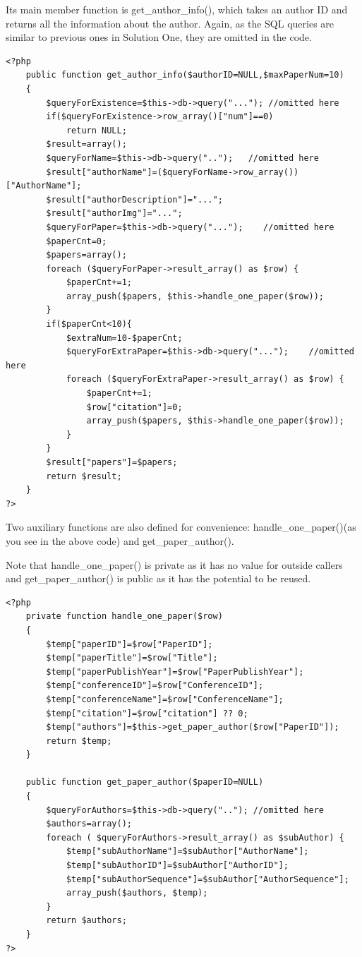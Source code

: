 \documentclass[a4paper]{article}
\begin{document}
Its main member function is get\_author\_info(), which takes an author ID and returns all the information about the author. Again, as the SQL queries are similar to previous ones in Solution One, they are omitted in the code.
                \begin{verbatim}
<?php
    public function get_author_info($authorID=NULL,$maxPaperNum=10)
    {
        $queryForExistence=$this->db->query("..."); //omitted here
        if($queryForExistence->row_array()["num"]==0)
            return NULL;
        $result=array();
        $queryForName=$this->db->query("..");   //omitted here
        $result["authorName"]=($queryForName->row_array())["AuthorName"];
        $result["authorDescription"]="...";
        $result["authorImg"]="...";
        $queryForPaper=$this->db->query("...");    //omitted here
        $paperCnt=0;
        $papers=array();
        foreach ($queryForPaper->result_array() as $row) {
            $paperCnt+=1;
            array_push($papers, $this->handle_one_paper($row));
        }
        if($paperCnt<10){
            $extraNum=10-$paperCnt;
            $queryForExtraPaper=$this->db->query("...");    //omitted here
            foreach ($queryForExtraPaper->result_array() as $row) {
                $paperCnt+=1;
                $row["citation"]=0;
                array_push($papers, $this->handle_one_paper($row));
            }
        }
        $result["papers"]=$papers;
        return $result;
    }
?>

                \end{verbatim}
Two auxiliary functions are also defined for convenience: handle\_one\_paper()(as you see in the above code) and get\_paper\_author().

Note that handle\_one\_paper() is private as it has no value for outside callers and get\_paper\_author() is public as it has the potential to be reused.
                \begin{verbatim}
<?php
    private function handle_one_paper($row)
    {
        $temp["paperID"]=$row["PaperID"];
        $temp["paperTitle"]=$row["Title"];
        $temp["paperPublishYear"]=$row["PaperPublishYear"];
        $temp["conferenceID"]=$row["ConferenceID"];
        $temp["conferenceName"]=$row["ConferenceName"];
        $temp["citation"]=$row["citation"] ?? 0;
        $temp["authors"]=$this->get_paper_author($row["PaperID"]);
        return $temp;
    }

    public function get_paper_author($paperID=NULL)
    {
        $queryForAuthors=$this->db->query(".."); //omitted here
        $authors=array();
        foreach ( $queryForAuthors->result_array() as $subAuthor) {
            $temp["subAuthorName"]=$subAuthor["AuthorName"];
            $temp["subAuthorID"]=$subAuthor["AuthorID"];
            $temp["subAuthorSequence"]=$subAuthor["AuthorSequence"];
            array_push($authors, $temp);
        }
        return $authors;
    }
?>
                \end{verbatim}
\end{document}
